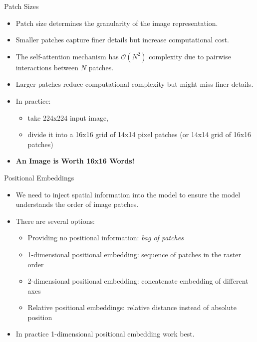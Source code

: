 \begin{frame}{Patch Sizes}
    \begin{itemize}
        \item Patch size determines the granularity of the image representation.
        \item Smaller patches capture finer details but increase computational cost.
        \item The self-attention mechanism has $\mathcal{O}(N^2)$ complexity due to pairwise interactions between $N$ patches. 
        \item Larger patches reduce computational complexity but might miss finer details.
        \item In practice: 
            \begin{itemize}
                \item take 224x224 input image,
                \item divide it into a 16x16 grid of 14x14 pixel patches (or 14x14 grid of 16x16 patches)
            \end{itemize} 
        \item \textbf{An Image is Worth 16x16 Words!}
    \end{itemize}
\end{frame}


\begin{frame}{Positional Embeddings}
    \begin{itemize}
        \item We need to inject spatial information into the model to ensure the model understands the order of image patches.
        \item There are several options: 
        \begin{itemize}
            \item Providing no positional information: \textit{bag of patches}
            \item 1-dimensional positional embedding: sequence of patches in the raster order
            \item 2-dimensional positional embedding: concatenate embedding of different axes
            \item Relative positional embeddings: relative distance instead of absolute position
        \end{itemize}
        \item In practice 1-dimensional positional embedding work best.
    \end{itemize}
\end{frame}



